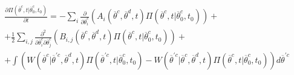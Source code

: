 \begin{equation}
\label{eq:CK}
\begin{matrix}
\frac{\partial \Pi \left (\overline{\theta}^{c},t|\overline{\theta}_{0}^{c},t_{0}
\right ) }{\partial t} = - \sum_i \frac{\partial }{\partial \overline{\theta}_{i}^{c}} \left ( A_{i}\left (  \overline{\theta}^{c}, \overline{\theta}^{d}, t\right ) \Pi \left (\overline{\theta}^{c},t|\overline{\theta}_{0}^{c},t_{0}
\right )  \right ) +
\\
+ \frac{1}{2}\sum_{i,j} \frac{\partial^2 }{\partial \overline{\theta}^{c}_{i} \partial \overline{\theta}^{c}_{j}}\left ( B_{i,j}\left (  \overline{\theta}^{c}, \overline{\theta}^{d}, t\right ) \Pi \left (\overline{\theta}^{c},t|\overline{\theta}_{0}^{c},t_{0}
\right )  \right ) +
\\
+ \int \left (  W\left ( \overline{\theta}^{c}|
\overline{\theta}^{'c},\overline{\theta}^{d},t \right )\Pi \left (\overline{\theta}^{'c},t|\overline{\theta}_{0}^{c},t_{0}
\right ) - W\left ( \overline{\theta}^{'c}|
\overline{\theta}^{c},\overline{\theta}^{d},t \right )\Pi \left (\overline{\theta}^{c},t|\overline{\theta}_{0}^{c},t_{0}
\right )  \right )d\overline{\theta}^{'c}
\end{matrix}
\end{equation}

